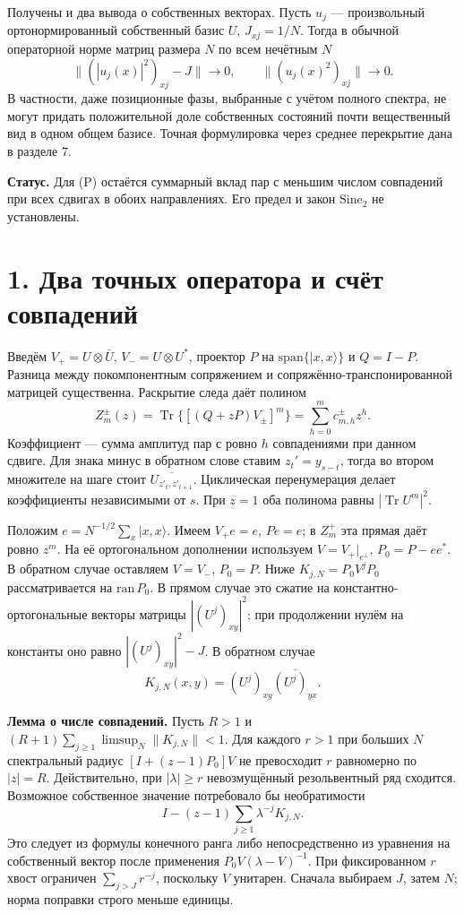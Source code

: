 \documentclass[11pt,a4paper]{article}
\newcommand{\Tr}{\operatorname{Tr}}
\newcommand{\sect}[1]{\section*{\sffamily\color{ink}#1}}
\begin{document}
Получены и два вывода о собственных векторах. Пусть $u_j$ --- произвольный ортонормированный собственный базис $U$, $J_{xj}=1/N$. Тогда в обычной операторной норме матриц размера $N$ по всем нечётным $N$
\[
 \big\|( |u_j(x)|^2)_{xj}-J\big\|\longrightarrow0,\qquad
 \big\|( u_j(x)^2)_{xj}\big\|\longrightarrow0.                              \tag{2}
\]
В частности, даже позиционные фазы, выбранные с учётом полного спектра, не могут придать положительной доле собственных состояний почти вещественный вид в одном общем базисе. Точная формулировка через среднее перекрытие дана в разделе 7.

\textbf{Статус.} Для (P) остаётся суммарный вклад пар с меньшим числом совпадений при всех сдвигах в обоих направлениях. Его предел и закон $\mathrm{Sine}_2$ не установлены.
\newpage
\sect{1. Два точных оператора и счёт совпадений}
Введём $V_+=U\otimes\bar U$, $V_-=U\otimes U^*$, проектор $P$ на $\mathrm{span}\{|x,x\rangle\}$ и $Q=I-P$. Разница между покомпонентным сопряжением и сопряжённо-транспонированной матрицей существенна. Раскрытие следа даёт полином
\[
 Z_m^\pm(z)=\Tr\{[(Q+zP)V_\pm]^m\}=\sum_{h=0}^m c_{m,h}^\pm z^h .
\]
Коэффициент --- сумма амплитуд пар с ровно $h$ совпадениями при данном сдвиге. Для знака минус в обратном слове ставим $z_t'=y_{s-t}$, тогда во втором множителе на шаге стоит $\overline{U_{z'_t,z'_{t+1}}}$. Циклическая перенумерация делает коэффициенты независимыми от $s$. При $z=1$ оба полинома равны $|\Tr U^m|^2$.

Положим $e=N^{-1/2}\sum_x |x,x\rangle$. Имеем $V_+e=e$, $Pe=e$; в $Z_m^+$ эта прямая даёт ровно $z^m$. На её ортогональном дополнении используем $V=V_+|_{e^\perp}$, $P_0=P-ee^*$. В обратном случае оставляем $V=V_-$, $P_0=P$. Ниже $K_{j,N}=P_0 V^jP_0$ рассматривается на $\mathrm{ran}\,P_0$. В прямом случае это сжатие на константно-ортогональные векторы матрицы $|(U^j)_{xy}|^2$; при продолжении нулём на константы оно равно $|(U^j)_{xy}|^2-J$. В обратном случае
\[
                    K_{j,N}(x,y)=(U^j)_{xy}\overline{(U^j)_{yx}} .
\]

\textbf{Лемма о числе совпадений.} Пусть $R>1$ и $(R+1)\sum_{j\ge1}\limsup_N\|K_{j,N}\|<1$. Для каждого $r>1$ при больших $N$ спектральный радиус $[I+(z-1)P_0]V$ не превосходит $r$ равномерно по $|z|=R$. Действительно, при $|\lambda|\ge r$ невозмущённый резольвентный ряд сходится. Возможное собственное значение потребовало бы необратимости
\[
 I-(z-1)\sum_{j\ge1}\lambda^{-j}K_{j,N}.
\]
Это следует из формулы конечного ранга либо непосредственно из уравнения на собственный вектор после применения $P_0 V(\lambda-V)^{-1}$. При фиксированном $r$ хвост ограничен $\sum_{j>J}r^{-j}$, поскольку $V$ унитарен. Сначала выбираем $J$, затем $N$; норма поправки строго меньше единицы.
\end{document}
